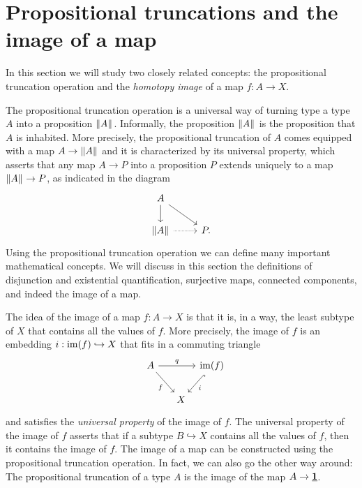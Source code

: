 \section{Propositional truncations and the image of a map}\label{chap:image}

In this section we will study two closely related concepts: the propositional truncation operation and the \emph{homotopy image} of a map $f:A\to X$.

The propositional truncation operation is a universal way of turning type a type $A$ into a proposition $\Vert A\Vert_{}$. Informally, the proposition $\Vert A\Vert_{}$ is the proposition that $A$ is inhabited. More precisely, the propositional truncation of $A$ comes equipped with a map $A\to\Vert A\Vert_{}$ and it is characterized by its universal property, which asserts that any map $A\to P$ into a proposition $P$ extends uniquely to a map $\Vert A\Vert_{}\to P$, as indicated in the diagram
\begin{equation*}
  \begin{tikzcd}
    A \arrow[dr] \arrow[d] \\
    \brck{A} \arrow[r,densely dotted] & P.
  \end{tikzcd}
\end{equation*}
Using the propositional truncation operation we can define many important mathematical concepts. We will discuss in this section the definitions of disjunction and existential quantification, surjective maps, connected components, and indeed the image of a map.

The idea of the image of a map $f:A\to X$ is that it is, in a way, the least subtype of $X$ that contains all the values of $f$. More precisely, the image of $f$ is an embedding $i:\operatorname{im}(f)\hookrightarrow X$ that fits in a commuting triangle
\begin{equation*}
  \begin{tikzcd}[column sep=tiny]
    A \arrow[rr,"q"] \arrow[dr,swap,"f"] & & \im(f) \arrow[dl,hook,"i"] \\
    \phantom{\im(f)} & X
  \end{tikzcd}
\end{equation*}
and satisfies the \emph{universal property} of the image of $f$. The universal property of the image of $f$ asserts that if a subtype $B\hookrightarrow X$ contains all the values of $f$, then it contains the image of $f$.
The image of a map can be constructed using the propositional truncation operation. In fact, we can also go the other way around: The propositional truncation of a type $A$ is the image of the map $A\to\underline{\mathbf{1}}$.

